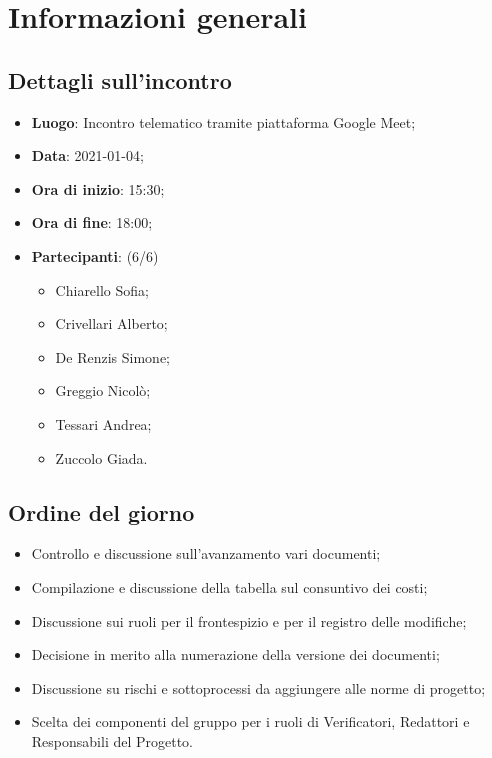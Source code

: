 \section{Informazioni generali}

\subsection{Dettagli sull'incontro}
\begin{itemize}
\item \textbf{Luogo}: Incontro telematico tramite piattaforma Google Meet;
\item \textbf{Data}: 2021-01-04;
\item \textbf{Ora di inizio}: 15:30;
\item \textbf{Ora di fine}: 18:00;
\item \textbf{Partecipanti}: (6/6) 
\begin{itemize}
	\item Chiarello Sofia;
	\item Crivellari Alberto;
	\item De Renzis Simone;
	\item Greggio Nicolò;
	\item Tessari Andrea;
	\item Zuccolo Giada.
\end{itemize}
\end{itemize}

\subsection{Ordine del giorno}
\begin{itemize}
	\item Controllo e discussione sull'avanzamento vari documenti;
	\item Compilazione e discussione della tabella sul consuntivo dei costi;
	\item Discussione sui ruoli per il frontespizio e per il registro delle modifiche;
	\item Decisione in merito alla numerazione della versione dei documenti;
	\item Discussione su rischi e sottoprocessi da aggiungere alle norme di progetto;
	\item Scelta dei componenti del gruppo per i ruoli di Verificatori, Redattori e Responsabili del Progetto.

\end{itemize}


